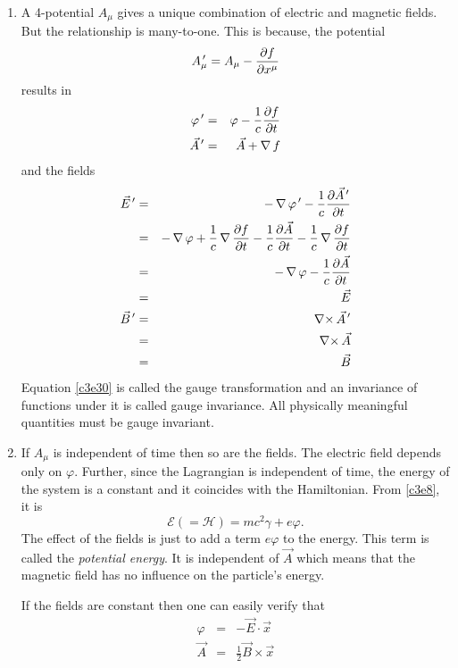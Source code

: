 \begin{enumerate}
\item A 4-potential $A_\mu$ gives a unique combination of electric and magnetic
fields. But the relationship is many-to-one. This is because, the potential
\begin{equation}\label{c3e30}
A_\mu^{\,\prime} = A_\mu - \frac{\partial{f}}{\partial{x^\mu}}
\end{equation}
results in
\begin{eqnarray}
\varphi^{\,\prime} &=& \varphi - \frac{1}{c}\frac{\partial{f}}{\partial{t}} \label{c3e31} \\
\vec{A}^{\,\prime} &=& \vec{A} + \operatorname{\nabla} f \label{c3e32}
\end{eqnarray}
and the fields
\begin{eqnarray}
\vec{E}^{\,\prime} &=& -\operatorname{\nabla}{\varphi^{\,\prime}} - \frac{1}{c}\frac{\partial{\vec{A}^{\,\prime}}}{\partial{t}} \nonumber \\
 &=& -\operatorname{\nabla}\varphi + \frac{1}{c}\operatorname{\nabla}\frac{\partial{f}}{\partial{t}} - 
      \frac{1}{c}\frac{\partial{\vec{A}}}{\partial{t}} - \frac{1}{c}\operatorname{\nabla}{\frac{\partial{f}}{\partial{t}}} \nonumber \\
 &=& -\operatorname{\nabla}\varphi - \frac{1}{c}\frac{\partial{\vec{A}}}{\partial{t}} \nonumber \\
 &=& \vec{E} \label{c3e33} \\
\vec{B}^{\,\prime} &=& \operatorname{\nabla\times}\vec{A}^{\,\prime} \nonumber \\
 &=& \operatorname{\nabla\times}\vec{A} \nonumber \\
 &=& \vec{B} \label{c3e34}
\end{eqnarray}
Equation \eqref{c3e30} is called the gauge transformation and an invariance of
functions under it is called gauge invariance. All physically meaningful quantities
must be gauge invariant.

\item If $A_\mu$ is independent of time then so are the fields. The electric field
depends only on $\varphi$. Further, since the Lagrangian is independent of time, the
energy of the system is a constant and it coincides with the Hamiltonian. From
\eqref{c3e8}, it is
\begin{equation}\label{c3e35}
\mathcal{E} (= \mathcal{H}) = mc^2\gamma + e\varphi.
\end{equation} 
The effect of the fields is just to add a term $e\varphi$ to the energy. This term
is called the \emph{potential energy}. It is independent of $\vec{A}$ which means
that the magnetic field has no influence on the particle's energy.

If the fields are constant then one can easily verify that
\begin{eqnarray}
\varphi &=& -\vec{E}\cdot\vec{x} \label{c3e36} \\
\vec{A} &=& \frac{1}{2}\vec{B} \times \vec{x} \label{c3e37}
\end{eqnarray}


\end{enumerate}
